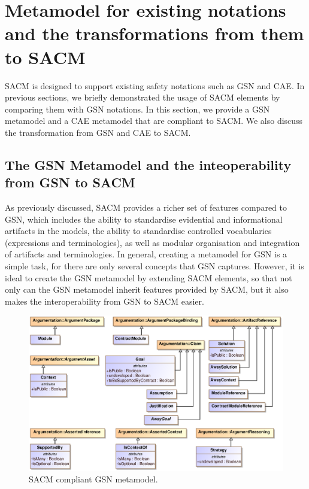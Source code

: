 \section{Metamodel for  existing notations and the transformations from them to SACM}
\label{sec:mapping}
SACM is designed to support existing safety notations such as GSN and CAE. 
In previous sections, we briefly demonstrated the usage of SACM elements by comparing them with GSN notations. 
In this section, we provide a GSN metamodel and a CAE metamodel that are compliant to SACM. 
We also discuss the transformation from GSN and CAE to SACM.

\subsection{The GSN Metamodel and the inteoperability from GSN to SACM}
As previously discussed, SACM provides a richer set of features compared to GSN, which includes the ability to standardise evidential and informational artifacts in the models, the ability to standardise controlled vocabularies (expressions and terminologies), as well as modular organisation and integration of artifacts and terminologies. 
In general, creating a metamodel for GSN is a simple task, for there are only several concepts that GSN captures. 
However, it is ideal to create the GSN metamodel by extending SACM elements, so that not only can the GSN metamodel inherit features provided by SACM, but it also makes the interoperability from GSN to SACM easier. 

\begin{figure}
	\centering
	\includegraphics[width=1\linewidth]{GSN.eps}
	\caption{SACM compliant GSN metamodel.}
	\label{fig:gsnMetamodel}
\end{figure}

